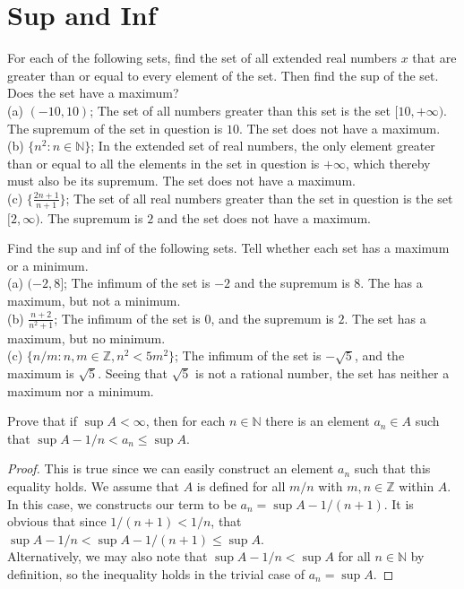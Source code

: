 \documentclass[12pt]{book}
\newenvironment{exercise}[2][Exercise]{\begin{trivlist}
\item[\hskip \labelsep {\bfseries #1}\hskip \labelsep {\bfseries #2.}]}{\end{trivlist}}
\begin{document}
\section{Sup and Inf}

\begin{exercise}{1.5.1}
For each of the following sets, find the set of all extended real numbers $x$ that are greater than or equal to every element of the set. Then find the sup of the set. Does the set have a maximum? \\
(a) $(-10, 10)$; The set of all numbers greater than this set is the set $[10, +\infty)$. The supremum of the set in question is $10$. The set does not have a maximum.\\
(b) $\{n^2 : n \in \mathbb{N}\}$; In the extended set of real numbers, the only element greater than or equal to all the elements in the set in question is $+\infty$, which thereby must also be its supremum. The set does not have a maximum.\\
(c) $\{ \frac{2n+1}{n+1}\}$; The set of all real numbers greater than the set in question is the set $[2,\infty)$. The supremum is $2$ and the set does not have a maximum.
\end{exercise}



\begin{exercise}{1.5.2}
Find the sup and inf of the following sets. Tell whether each set has a maximum or a minimum. \\
(a) $(-2,8]$; The infimum of the set is $-2$ and the supremum is $8$. The has a maximum, but not a minimum. \\
(b) $\frac{n+2}{n^2+1}$; The infimum of the set is 0, and the supremum is $2$. The set has a maximum, but no minimum.\\
(c) $\{ n/m : n,m \in \mathbb{Z}, n^2<5m^2\}$; The infimum of the set is $- \sqrt{5}$, and the maximum is $\sqrt{5}$. Seeing that $\sqrt{5}$ is not a rational number, the set has neither a maximum nor a minimum.
\end{exercise}




\begin{exercise}{1.5.3}
Prove that if $\sup A < \infty$, then for each $n \in \mathbb{N}$ there is an element $a_n \in A$
such that $\sup A - 1/n < a_n \leq \sup A$. 

	\begin{proof}
	This is true since we can easily construct an element $a_n$ such that this equality holds. We assume that $A$ is defined for all $m/n$ with $m,n \in \mathbb{Z}$ within $A$. In this case, we constructs our term to be $a_n = \sup A - 1/(n+1)$. It is obvious that since $1/(n+1) < 1/n$, that $\sup A - 1/n < \sup A - 1/(n+1) \leq \sup A$. \\
	Alternatively, we may also note that $\sup A - 1/n < \sup A$ for all $n \in \mathbb{N}$ by definition, so the inequality holds in the trivial case of $a_n = \sup A$. 
	\end{proof}
\end{exercise}
\end{document}
